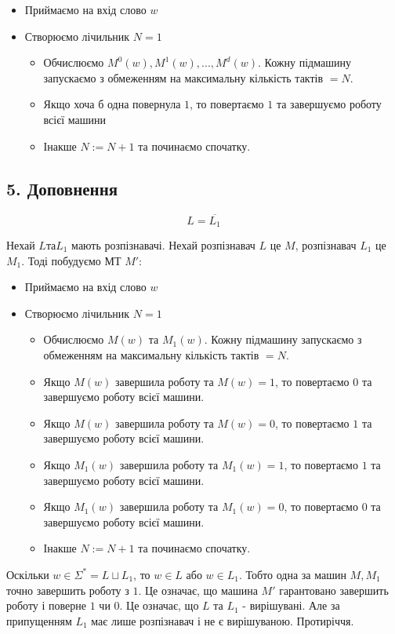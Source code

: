 \documentclass[11pt, a4paper]{article} %
\begin{document}
\begin{itemize}
    \item Приймаємо на вхід слово $w$
    \item Створюємо лічильник $N = 1$
    \begin{itemize}
        \item Обчислюємо $M^0(w), M^1(w), ..., M^d(w)$. 
        Кожну підмашину запускаємо з обмеженням на максимальну кількість тактів $= N$.
        \item Якщо хоча б одна повернула $1$, то повертаємо $1$ та завершуємо роботу всієї машини
        \item Інакше $N := N + 1$ та починаємо спочатку.
    \end{itemize}
\end{itemize}
\qedsymbol

\subsection*{5. Доповнення}
\label{3.8.5}
$$L = \overline{L_1}$$

Нехай $L та L_1$ мають розпізнавачі. Нехай розпізнавач $L$ це $M$, розпізнавач $L_1$ це $M_1$. Тоді побудуємо МТ $M'$:
\begin{itemize}
    \item Приймаємо на вхід слово $w$
    \item Створюємо лічильник $N = 1$
    \begin{itemize}
        \item Обчислюємо $M(w)$ та $M_1(w)$. 
        Кожну підмашину запускаємо з обмеженням на максимальну кількість тактів $= N$.
        \item Якщо $M(w)$ завершила роботу та $M(w) = 1$, то повертаємо $0$ та завершуємо роботу всієї машини.
        \item Якщо $M(w)$ завершила роботу та $M(w) = 0$, то повертаємо $1$ та завершуємо роботу всієї машини.
        \item Якщо $M_1(w)$ завершила роботу та $M_1(w) = 1$, то повертаємо $1$ та завершуємо роботу всієї машини.
        \item Якщо $M_1(w)$ завершила роботу та $M_1(w) = 0$, то повертаємо $0$ та завершуємо роботу всієї машини.
        \item Інакше $N := N + 1$ та починаємо спочатку.
    \end{itemize}
\end{itemize}

Оскільки $w \in \Sigma^* = L \sqcup L_1$, то $w \in L$ або $w \in L_1$. 
Тобто одна за машин $M, M_1$ точно завершить роботу з $1$. 
Це означає, що машина $M'$ гарантовано завершить роботу і поверне $1$ чи $0$.
Це означає, що $L$ та $L_1$ - вирішувані. Але за припущенням $L_1$ має лише розпізнавач і не є вирішуваною.
Протиріччя.
\end{document}
